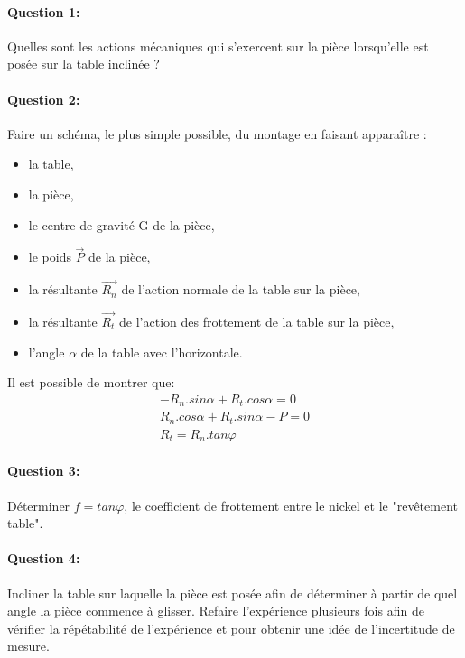 




\paragraph{Question 1:} Quelles sont les actions mécaniques qui s'exercent sur la pièce lorsqu'elle est posée sur la table inclinée ?

\paragraph{Question 2:} Faire un schéma, le plus simple possible, du montage en faisant apparaître :
\begin{itemize}
 \item la table,
 \item la pièce,
 \item le centre de gravité G de la pièce,
 \item le poids $\overrightarrow{P}$ de la pièce,
 \item la résultante $\overrightarrow{R_n}$ de l'action normale de la table sur la pièce,
 \item la résultante $\overrightarrow{R_t}$ de l'action des frottement de la table sur la pièce,
 \item l'angle $\alpha$ de la table avec l'horizontale.
\end{itemize}

Il est possible de montrer que:
\begin{eqnarray}
 -R_n.sin\alpha+R_t.cos\alpha=0 \\
 R_n.cos\alpha+R_t.sin\alpha-P=0 \\
 R_t=R_n.tan\varphi
\end{eqnarray}

\paragraph{Question 3:} Déterminer $f=tan\varphi$, le coefficient de frottement entre le nickel et le "revêtement table".


\paragraph{Question 4:} Incliner la table sur laquelle la pièce est posée afin de déterminer à partir de quel angle la pièce commence à glisser. Refaire l'expérience plusieurs fois afin de vérifier la répétabilité de l'expérience et pour obtenir une idée de l'incertitude de mesure.

